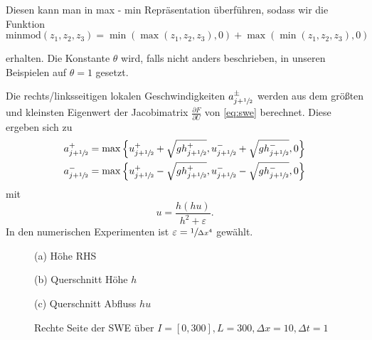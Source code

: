 Diesen kann man in max - min Repräsentation überführen, sodass wir die Funktion
 \begin{equation}
\text{minmod}(z_1,z_2,z_3) = \min(\max(z_1,z_2,z_3),0) + \max(\min(z_1,z_2,z_3),0)    
 \end{equation}

erhalten. Die Konstante $\theta$ wird, falls nicht anders beschrieben, in unseren Beispielen auf $\theta=1$ gesetzt. 

Die rechts/linksseitigen lokalen Geschwindigkeiten $a^\pm_{j+\sfrac{1}{2}}$ werden aus dem größten und kleinsten Eigenwert der Jacobimatrix $\frac{\partial F}{\partial U}$ von \eqref{eq:swe} berechnet. Diese ergeben sich zu
\[
 \begin{aligned}
 a^+_{j+\sfrac{1}{2}} &= \max \left\lbrace u^+_{j+\sfrac{1}{2}} + \sqrt{gh^+_{j+\sfrac{1}{2}}},u^-_{j+\sfrac{1}{2}} + \sqrt{gh^-_{j+\sfrac{1}{2}}},0\right\rbrace\\
 a^-_{j+\sfrac{1}{2}} &= \max \left\lbrace u^+_{j+\sfrac{1}{2}} - \sqrt{gh^+_{j+\sfrac{1}{2}}},u^-_{j+\sfrac{1}{2}} - \sqrt{gh^-_{j+\sfrac{1}{2}}},0\right\rbrace
 \end{aligned}
\]
mit \begin{equation}
u=\frac{h(hu)}{h^2 + \varepsilon}.
\label{eq:sweHuToU}
    \end{equation}
In den numerischen Experimenten ist $\varepsilon = \sfrac{1}{\Delta x^4}$ gewählt.
\begin{figure}
\footnotesize
\centering
\begin{minipage}[b]{\linewidth}

\caption*{(a) Höhe RHS}
\end{minipage}
\begin{minipage}[b]{0.49\linewidth}

\caption*{(b) Querschnitt Höhe $h$}
\end{minipage}
\begin{minipage}[b]{0.49\linewidth}

\caption*{(c) Querschnitt Abfluss $hu$}
\end{minipage}
\caption{Rechte Seite der SWE über $I=[0,300], L=300, \Delta x=10, \Delta t = 1$}
\label{fig:sweGrad}
\end{figure}


